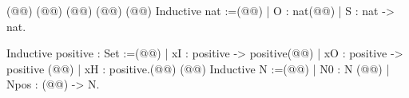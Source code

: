 (@\vspace{-0.04cm}@)
(@\vspace{-0.04cm}@)
(@\vspace{-0.04cm}@)
(@\vspace{-0.04cm}@)
(@\vspace{-0.04cm}@)
Inductive nat :=(@\vspace{-0.04cm}@)
| O : nat(@\vspace{-0.04cm}@)
| S : nat -> nat.

Inductive positive : Set :=(@\vspace{-0.04cm}@)
| xI : positive -> positive(@\vspace{-0.04cm}@)
| xO : positive -> positive (@\vspace{-0.04cm}@)
| xH : positive.(@\vspace{-0.04cm}@)
(@\vspace{-0.04cm}@)
Inductive N :=(@\vspace{-0.04cm}@)
| N0 : N (@\vspace{-0.04cm}@)
| Npos : (@@) -> N.
